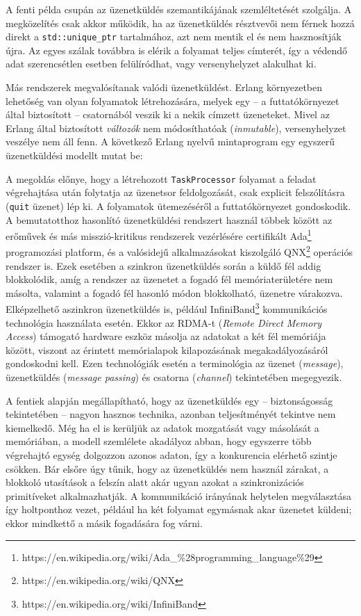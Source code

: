     A fenti példa csupán az üzenetküldés szemantikájának szemléltetését szolgálja. A megközelítés csak akkor működik, ha az üzenetküldés résztvevői nem férnek hozzá direkt a \texttt{std::unique\_ptr} tartalmához, azt nem mentik el és nem hasznosítják újra. Az egyes szálak továbbra is elérik a folyamat teljes címterét, így a védendő adat szerencsétlen esetben felülíródhat, vagy versenyhelyzet alakulhat ki.
    
    Más rendszerek megvalósítanak valódi üzenetküldést. Erlang környezetben lehetőség van olyan folyamatok létrehozására, melyek egy -- a futtatókörnyezet által biztosított -- csatornából veszik ki a nekik címzett üzeneteket. Mivel az Erlang által biztosított \emph{változók} nem módosíthatóak (\emph{inmutable}), versenyhelyzet veszélye nem áll fenn. A következő Erlang nyelvű mintaprogram egy egyszerű üzenetküldési modellt mutat be:
    
    \medskip    
    \lstset{
        basicstyle=\footnotesize\ttfamily
    }    
        
    \medskip
    
    A megoldás előnye, hogy a létrehozott \texttt{TaskProcessor} folyamat a feladat végrehajtása után folytatja az üzenetsor feldolgozását, csak explicit felszólításra (\texttt{quit} üzenet) lép ki. A folyamatok ütemezéséről a futtatókörnyezet gondoskodik. A bemutatotthoz hasonlító üzenetküldési rendszert használ többek között az erőművek és más misszió-kritikus rendszerek vezérlésére certifikált Ada\footnote{https://en.wikipedia.org/wiki/Ada\_\%28programming\_language\%29} programozási platform, és a valósidejű alkalmazásokat kiszolgáló QNX\footnote{https://en.wikipedia.org/wiki/QNX} operációs rendszer is. Ezek esetében a szinkron üzenetküldés során a küldő fél addig blokkolódik, amíg a rendszer az üzenetet a fogadó fél memóriaterületére nem másolta, valamint a fogadó fél hasonló módon blokkolható, üzenetre várakozva. Elképzelhető aszinkron üzenetküldés is, például InfiniBand\footnote{https://en.wikipedia.org/wiki/InfiniBand} kommunikációs technológia használata esetén. Ekkor az RDMA-t (\emph{Remote Direct Memory Access}) támogató hardware eszköz másolja az adatokat a két fél memóriája között, viszont az érintett memórialapok kilapozásának megakadályozásáról gondoskodni kell. Ezen technológiák esetén a terminológia az üzenet (\emph{message}), üzenetküldés (\emph{message passing}) és csatorna (\emph{channel}) tekintetében megegyezik.
    
    A fentiek alapján megállapítható, hogy az üzenetküldés egy -- biztonságosság tekintetében -- nagyon hasznos technika, azonban teljesítményét tekintve nem kiemelkedő. Még ha el is kerüljük az adatok mozgatását vagy másolását a memóriában, a modell szemlélete akadályoz abban, hogy egyszerre több végrehajtó egység dolgozzon azonos adaton, így a konkurencia elérhető szintje csökken. Bár elsőre úgy tűnik, hogy az üzenetküldés nem használ zárakat, a blokkoló utasítások a felszín alatt akár ugyan azokat a szinkronizációs primitíveket alkalmazhatják. A kommunikáció irányának helytelen megválasztása így holtponthoz vezet, például ha két folyamat egymásnak akar üzenetet küldeni; ekkor mindkettő a másik fogadására fog várni.
    
